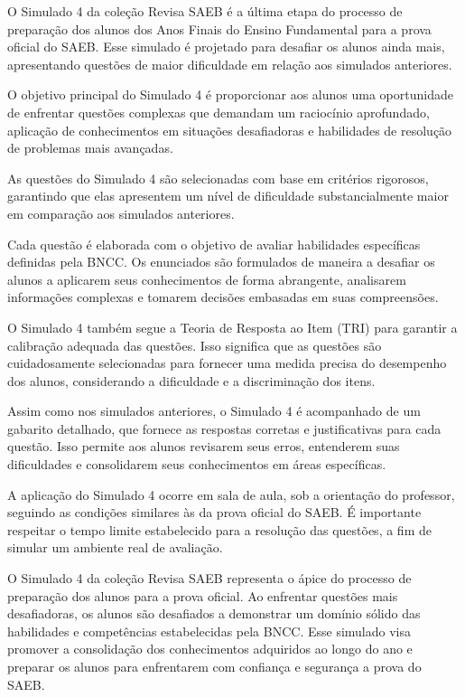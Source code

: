 O Simulado 4 da coleção Revisa SAEB é a última etapa do processo de preparação dos
alunos dos Anos Finais do Ensino Fundamental para a prova oficial do
SAEB. Esse simulado é projetado para desafiar os alunos ainda mais,
apresentando questões de maior dificuldade em relação aos simulados
anteriores.

O objetivo principal do Simulado 4 é proporcionar aos alunos uma
oportunidade de enfrentar questões complexas que demandam um raciocínio
aprofundado, aplicação de conhecimentos em situações desafiadoras e
habilidades de resolução de problemas mais avançadas.

As questões do Simulado 4 são selecionadas com base em critérios
rigorosos, garantindo que elas apresentem um nível de dificuldade
substancialmente maior em comparação aos simulados anteriores.

Cada questão é elaborada com o objetivo de avaliar habilidades
específicas definidas pela BNCC. Os enunciados são formulados de maneira
a desafiar os alunos a aplicarem seus conhecimentos de forma abrangente,
analisarem informações complexas e tomarem decisões embasadas em suas
compreensões.

O Simulado 4 também segue a Teoria de Resposta ao Item (TRI) para
garantir a calibração adequada das questões. Isso significa que as
questões são cuidadosamente selecionadas para fornecer uma medida
precisa do desempenho dos alunos, considerando a dificuldade e a
discriminação dos itens.

Assim como nos simulados anteriores, o Simulado 4 é acompanhado de um
gabarito detalhado, que fornece as respostas corretas e justificativas
para cada questão. Isso permite aos alunos revisarem seus erros,
entenderem suas dificuldades e consolidarem seus conhecimentos em áreas
específicas.

A aplicação do Simulado 4 ocorre em sala de aula, sob a orientação do
professor, seguindo as condições similares às da prova oficial do SAEB.
É importante respeitar o tempo limite estabelecido para a resolução das
questões, a fim de simular um ambiente real de avaliação.

O Simulado 4 da coleção Revisa SAEB representa o ápice do processo de preparação dos
alunos para a prova oficial. Ao enfrentar questões mais desafiadoras, os
alunos são desafiados a demonstrar um domínio sólido das habilidades e
competências estabelecidas pela BNCC. Esse simulado visa promover a
consolidação dos conhecimentos adquiridos ao longo do ano e preparar os
alunos para enfrentarem com confiança e segurança a prova do SAEB.
